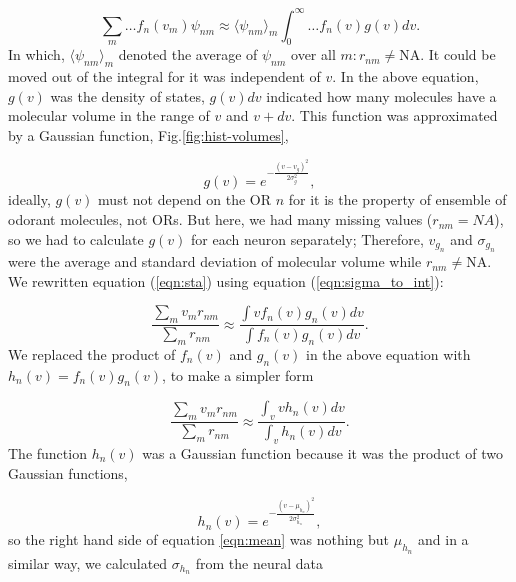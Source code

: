 \documentclass[11pt]{paper} %
\begin{document}
\begin{equation}
	\sum_{m} \dots f_n(v_m) \psi_{nm} \approx  \langle \psi_{nm} \rangle_m \int_0^\infty \dots f_n(v) g(v)  dv. 
	\label{eqn:sigma_to_int}
\end{equation}
In which, 
$\langle \psi_{nm} \rangle_m$ denoted the average of $\psi_{nm}$ over all $m: r_{nm} \neq \text{NA}$. 
It could be moved out of the integral for it was independent of $v$.
In the above equation, 
$g(v)$ was the density of states, $g(v) dv$ indicated how many molecules have a molecular volume in the range of $v$ and $v+dv$.
This function was approximated by a Gaussian function, Fig.\ref{fig:hist-volumes}, 

\begin{equation}
	g(v) = e^{-\frac{(v- v_{g})^2}{2 \sigma_{g}^2}},
	\label{eqn:hist-volumes}
\end{equation}
ideally, $g(v)$ must not depend on the OR $n$ for it is the property of ensemble of odorant molecules, not ORs. 
But here, we had many missing values ($r_{nm} = NA$), 
so we had to calculate $g(v)$ for each neuron separately; 
Therefore, $v_{g_n}$ and $\sigma_{g_n}$ were the average and standard deviation of molecular volume while $r_{nm} \neq \text{NA}$.
We rewritten equation (\ref{eqn:sta}) using equation (\ref{eqn:sigma_to_int}):

\begin{equation}
	\frac{\displaystyle \sum_{m} v_m r_{nm}}{\displaystyle \sum_{m} r_{nm}} \approx \frac{\displaystyle \int v f_n(v) g_n(v) dv}{\displaystyle \int f_n(v) g_n(v) dv}.
	\label{eqn:sta_int}
\end{equation}
We replaced the product of $f_n(v)$ and $g_n(v)$ in the above equation with $h_n(v) = f_n(v) g_n(v)$, to make a simpler form

\begin{equation}
	\frac{\displaystyle \sum_{m} v_m r_{nm}}{\displaystyle \sum_{m} r_{nm}} \approx \frac{\displaystyle \int_v v h_n(v) dv}{ \displaystyle \int_v  h_n(v) dv }.
	\label{eqn:mean}
\end{equation}
The function $h_n(v)$ was a Gaussian function because it was the product of two Gaussian functions, 

\begin{equation}
h_n(v) = e^{-\frac{(v-\mu_{h_n})^2}{2\sigma_{h_n}^2}}, 
\end{equation}
so the right hand side of equation \ref{eqn:mean} was nothing but $\mu_{h_n}$ and 
in a similar way, we calculated $\sigma_{h_n}$ from the neural data
\end{document}
